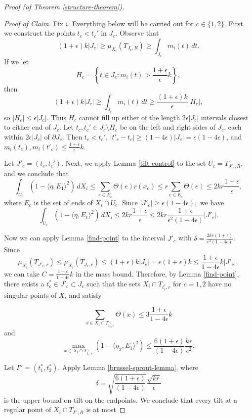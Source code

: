 \documentclass[10pt,a4paper]{amsart}
\begin{document}
\begin{proof}[Proof (of Theorem \ref{structure-theorem})]
\

\emph{Proof of Claim.} Fix $i$. Everything below will be carried out for $c \in \{1,2\}$. 
First we construct the points $t_c < t_c'$ in $J_c$. Observe that
\[(1+\epsilon)k|J_c| \geq \mu_{X_i}(T_{J_c,R}) \geq \int_{J_c} m_i(t) \, dt.\]
If we let
\[H_c = \left\{t \in J_c: m_i(t) > \frac{1+\epsilon}{\epsilon}k\right\},\]
then
\[(1+\epsilon)k|J_c| \geq \int_{J_c} m_i(t) \, dt \geq \frac{(1+\epsilon)k}{\epsilon}|H_c|,\]
so $|H_c| \leq \epsilon |J_c|.$ Thus $H_c$ cannot fill up either of the length $2\epsilon |J_c|$ intervals closest to either end of $J_c$. Let $t_c,t_c' \in J_c \setminus H_c$ be on the left and right sides of $J_c$, each within $2\epsilon |J_c|$ of $\partial J_c$. Then $t_c < t_c'$, $|t'_c - t_c| \geq (1-4\epsilon)|J_c| = \epsilon(1-4\epsilon)$, and $m_i(t_c),m_i(t'_c) \leq \frac{1+\epsilon}{\epsilon}k.$

Let $J'_c = (t_c,t_c')$. Next, we apply Lemma \ref{tilt-control} to the set $U_c = T_{J'_c,R}$, and we conclude that
\[\int_{U_c} (1-\langle \eta,E_1\rangle^2) \, dX_i \leq \sum_{e \in E_c} \Theta(e) r(x_e) \leq r\sum_{e \in E_c}\Theta(e) \leq 2kr \frac{1+\epsilon}{\epsilon},\]
where $E_c$ is the set of ends of $X_i \cap U_c$. Since $|J'_c| \geq \epsilon(1-4\epsilon),$ we have 
\[\int_{U_c} (1-\langle \eta,E_1\rangle^2) \, dX_i \leq 2kr\frac{1+\epsilon}{\epsilon} \leq 2kr \frac{1+\epsilon}{\epsilon^2(1-4\epsilon)} |J'_c|.\]

Now we can apply Lemma \ref{find-point} to the interval $J'_c$ with $\delta = \frac{2kr(1+\epsilon)}{\epsilon^2(1-4\epsilon)}$. Since
\[\mu_{X_i}(T_{J'_c,r}) \leq \mu_{X_i}(T_{J_c,r}) \leq (1+\epsilon)k |J_c| = \epsilon(1+\epsilon)k \leq \frac{1+\epsilon}{1-4\epsilon}k |J'_c|,\]
we can take $C = \frac{1+\epsilon}{1-4\epsilon}k$ in the mass bound. Therefore, by Lemma \ref{find-point}, there exists a $t^*_c \in J'_c \subset J_c$ such that the sets $X_i \cap T_{t_c^*,r}$ for $c=1,2$ have no singular points of $X_i$ and satisfy

\[\sum_{x \in X_i \cap T_{t_c^*,r}
} \Theta(x) \leq 3\frac{1+\epsilon}{1-4\epsilon} k\]
and
\[\max_{x \in X_i \cap T_{t_c^*,r}} (1-\langle \eta_x,E_1\rangle^2) \leq \frac{6(1+\epsilon)}{(1-4\epsilon)}\frac{kr}{\epsilon^2}.\]

Let $I'' = (t_1^*,t_2^*)$. Apply Lemma \ref{brussel-sprout-lemma}, where \[ \delta = \sqrt{\frac{6(1+\epsilon)}{(1-4\epsilon)}}\frac{\sqrt{kr}}{\epsilon} \]
is the upper bound on tilt on the endpoints. We conclude that every tilt at a regular point of $X_i \cap T_{I'',R}$ is at most


\end{proof}
\end{document}
